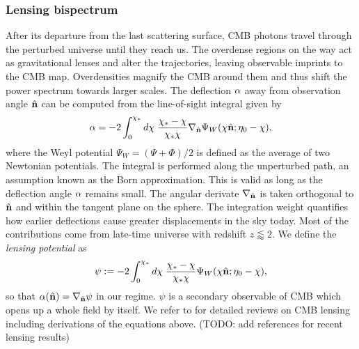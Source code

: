 \subsubsection*{Lensing bispectrum}

After its departure from the last scattering surface, CMB photons travel through the perturbed universe until they reach us. The overdense regions on the way act as gravitational lenses and alter the trajectories, leaving observable imprints to the CMB map. Overdensities magnify the CMB around them and thus shift the power spectrum towards larger scales. The deflection $\mathbf{\alpha}$ away from observation angle $\hat{\mathbf{n}}$ can be computed from the line-of-sight integral given by 
\begin{align}
	\mathbf{\alpha} = - 2\int_0^{\chi_*} d\chi \; \frac{\chi_* - \chi}{\chi_* \chi} \nabla_{\hat{\mathbf{n}}} \Psi_W (\chi\hat{\mathbf{n}}; \eta_0-\chi), 
\end{align}
where the Weyl potential $\Psi_W = (\Psi + \Phi)/2$ is defined as the average of two Newtonian potentials. The integral is performed along the unperturbed path, an assumption known as the Born approximation. This is valid as long as the deflection angle $\mathbf{\alpha}$ remains small. The angular derivate $\nabla_{\hat{\mathbf{n}}}$ is taken orthogonal to $\hat{\mathbf{n}}$ and within the tangent plane on the sphere. The integration weight quantifies how earlier deflections cause greater displacements in the sky today. Most of the contributions come from late-time universe with redshift $z\lessapprox2$. We define the \textit{lensing potential} as
\begin{align}
	\psi := - 2\int_0^{\chi_*} d\chi \; \frac{\chi_* - \chi}{\chi_* \chi}  \Psi_W (\chi\hat{\mathbf{n}}; \eta_0-\chi), \label{def:lensing_potential}
\end{align}
so that $\mathbf{\alpha}(\hat{\mathbf{n}}) = \nabla_{\hat{\mathbf{n}}} \psi$ in our regime. $\psi$ is a secondary observable of CMB which opens up a whole field by itself. We refer to \cite{Bartelmann2001weaklensing,Lewis2006weaklensing,Hanson2010weaklensing} for detailed reviews on CMB lensing including derivations of the equations above. (TODO: add references for recent lensing results)

